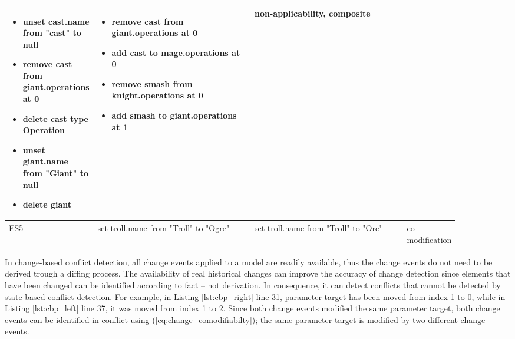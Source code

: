 \begin{table*}[ht]
\begin{scriptsize}
\begin{tabular}{|p{0.04\linewidth}|p{0.37\linewidth}|p{0.37\linewidth}|
      p{0.11\linewidth}|}
\begin{minipage}[t]{\linewidth}
\begin{itemize}[leftmargin=0pt]
        \item[] unset cast.name from "cast" to null
        \item[] remove cast from giant.operations at 0
        \item[] delete cast type Operation
        \item[] unset giant.name from "Giant" to null
        \item[] delete giant
      \end{itemize}
    \end{minipage}
    & 
    \begin{minipage}[t]{\linewidth}
      \raggedright
      \begin{itemize}[leftmargin=0pt]
        \setlength
        \item[] remove cast from giant.operations at 0
        \item[] add cast to mage.operations at 0
        \item[] remove smash from knight.operations at 0
        \item[] add smash to giant.operations at 1
      \end{itemize}
    \end{minipage}
    & 
    non-applicability, composite\\
    \hline
    ES5 & 
    set troll.name from "Troll" to "Ogre" & 
    set troll.name from "Troll" to "Orc" & 
    co-modification\\ 
    \hline
  \end{tabular}
\end{scriptsize}
\end{table*}

In change-based conflict detection, all change events applied to a model are readily available, thus the change events do not need to be derived trough a diffing process. The availability of real historical changes can improve the accuracy of change detection since elements that have been changed can be identified according to fact -- not derivation. In consequence, it can detect conflicts that cannot be detected by state-based conflict detection. For example, in Listing \ref{lst:cbp_right} line 31, parameter \textsf{target} has been moved from index 1 to 0, while in Listing \ref{lst:cbp_left} line 37, it was moved from index 1 to 2. Since both change events modified the same parameter \textsf{target}, both change events can be identified in conflict using (\ref{eq:change_comodifiabilty}); the same parameter \textsf{target} is modified by two different change events. 

